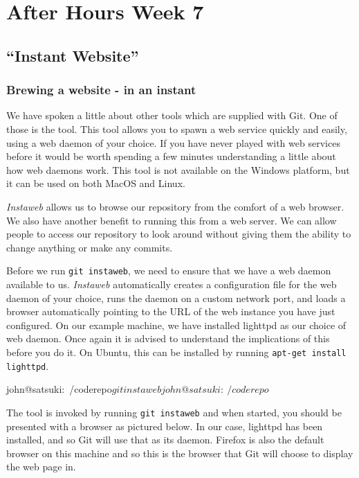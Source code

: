 \chapter{After Hours Week 7}
\section{``Instant Website''}
\subsection{Brewing a website - in an instant}
We have spoken a little about other tools which are supplied with Git.
One of those is the  tool.
This tool allows you to spawn a web service quickly and easily, using a web daemon of your choice.
If you have never played with web services before it would be worth spending a few minutes understanding a little about how web daemons work.
This tool is not available on the Windows platform, but it can be used on both MacOS and Linux.

\emph{Instaweb} allows us to browse our repository from the comfort of a web browser.
We also have another benefit to running this from a web server.
We can allow people to access our repository to look around without giving them the ability to change anything or make any commits.

Before we run \texttt{git instaweb}, we need to ensure that we have a web daemon available to us.
\emph{Instaweb} automatically creates a configuration file for the web daemon of your choice, runs the daemon on a custom network port,
and loads a browser automatically pointing to the URL of the web instance you have just configured.
On our example machine, we have installed lighttpd as our choice of web daemon.
Once again it is advised to understand the implications of this before you do it.
On Ubuntu, this can be installed by running \texttt{apt-get install lighttpd}.

\begin{code}
john@satsuki:~/coderepo$ git instaweb
john@satsuki:~/coderepo$ 
\end{code}

The tool is invoked by running \texttt{git instaweb} and when started, you should be presented with a browser as pictured below.
In our case, lighttpd has been installed, and so Git will use that as its daemon.
Firefox is also the default browser on this machine and so this is the browser that Git will choose to display the web page in.

